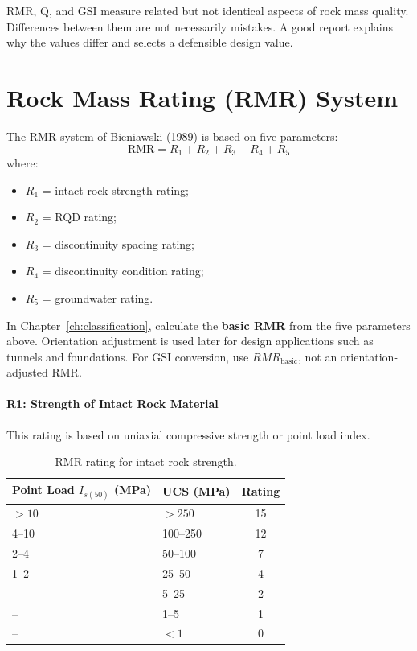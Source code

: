 \begin{warnbox}
RMR, Q, and GSI measure related but not identical aspects of rock mass quality.
Differences between them are not necessarily mistakes. A good report explains why
the values differ and selects a defensible design value.
\end{warnbox}

\section{Rock Mass Rating (RMR) System}

The RMR system of Bieniawski (1989) is based on five parameters:
\[
\text{RMR} = R_1 + R_2 + R_3 + R_4 + R_5
\]
where:
\begin{itemize}
 \item \(R_1\) = intact rock strength rating;
 \item \(R_2\) = RQD rating;
 \item \(R_3\) = discontinuity spacing rating;
 \item \(R_4\) = discontinuity condition rating;
 \item \(R_5\) = groundwater rating.
\end{itemize}

\begin{notebox}
In Chapter~\ref{ch:classification}, calculate the \textbf{basic RMR} from the five parameters above.
Orientation adjustment is used later for design applications such as tunnels and foundations. For GSI conversion, use \(RMR_{\text{basic}}\), not an orientation-adjusted RMR.
\end{notebox}

\paragraph{R1: Strength of Intact Rock Material}

This rating is based on uniaxial compressive strength or point load index.

\begin{table}[H]
\centering
\small
\begin{tabularx}{0.85\textwidth}{l l c}
\toprule
\textbf{Point Load \(I_{s(50)}\) (MPa)} & \textbf{UCS (MPa)} & \textbf{Rating} \\
\midrule
\(>10\) & \(>250\) & 15 \\
4--10 & 100--250 & 12 \\
2--4 & 50--100 & 7 \\
1--2 & 25--50 & 4 \\
-- & 5--25 & 2 \\
-- & 1--5 & 1 \\
-- & \(<1\) & 0 \\
\bottomrule
\end{tabularx}
\caption{RMR rating for intact rock strength.}
\label{tab:rmr_strength}
\end{table}

